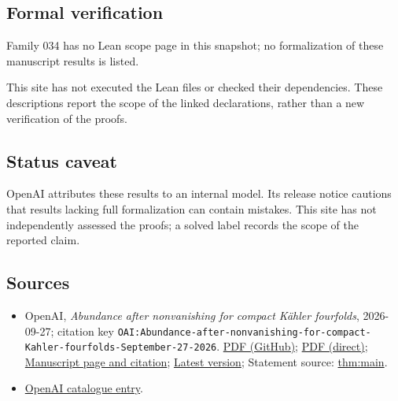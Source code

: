 \documentclass[11pt]{article}
\begin{document}
\subsection{Formal verification}
Family 034 has no Lean scope page in this snapshot; no formalization of these manuscript results is listed.

This site has not executed the Lean files or checked their dependencies. These descriptions report the scope of the linked declarations, rather than a new verification of the proofs.

\subsection{Status caveat}
OpenAI attributes these results to an internal model. Its release notice cautions that results lacking full formalization can contain mistakes. This site has not independently assessed the proofs; a solved label records the scope of the reported claim.

\subsection{Sources}
\begin{itemize}
\item OpenAI, \emph{Abundance after nonvanishing for compact Kähler fourfolds}, 2026-09-27; citation key \texttt{OAI:Abundance-after-nonvanishing-for-compact-Kahler-fourfolds-September-27-2026}. \href{https://github.com/openai/math/blob/adc7f1241b42e322a6451854ab7e4b4c146bf78a/preprints/Abundance-after-nonvanishing-for-compact-Kahler-fourfolds-September-27-2026/paper.pdf}{PDF (GitHub)}; \href{https://github.com/openai/math/raw/adc7f1241b42e322a6451854ab7e4b4c146bf78a/preprints/Abundance-after-nonvanishing-for-compact-Kahler-fourfolds-September-27-2026/paper.pdf}{PDF (direct)}; \href{https://github.com/openai/math/blob/adc7f1241b42e322a6451854ab7e4b4c146bf78a/preprints/Abundance-after-nonvanishing-for-compact-Kahler-fourfolds-September-27-2026/README.md}{Manuscript page and citation}; \href{https://github.com/openai/math/blob/main/preprints/Abundance-after-nonvanishing-for-compact-Kahler-fourfolds-September-27-2026/paper.pdf}{Latest version}; Statement source: \href{https://github.com/openai/math/blob/adc7f1241b42e322a6451854ab7e4b4c146bf78a/preprints/Abundance-after-nonvanishing-for-compact-Kahler-fourfolds-September-27-2026/build/sections/introduction.tex\#L23}{thm:main}.
\item \href{https://github.com/openai/math/blob/adc7f1241b42e322a6451854ab7e4b4c146bf78a/CONTENTS.md}{OpenAI catalogue entry}.
\end{itemize}
\end{document}
